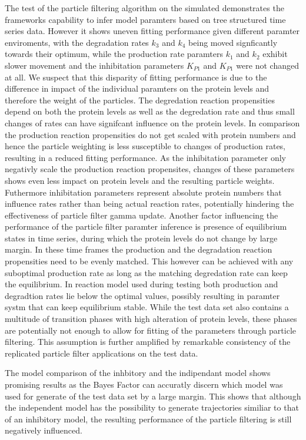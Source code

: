 \documentclass{bioinfo}
\begin{document}
The test of the particle filtering algorithm on the simulated demonstrates the frameworks capability to infer model paramters based on tree structured time series data. However it shows uneven fitting performance given different paramter enviroments, with the degradation rates $k_3$ and $k_4$ being moved signficantly towards their optimum, while the production rate paramters $k_1$ and $k_2$ exhibit slower movement and the inhibitation parameters $K_{P1}$ and $K_{P1}$ were not changed at all. We suspect that this disparity of fitting performance is due to the difference in impact of the individual paramters on the protein levels and therefore the weight of the particles. The degredation reaction propensities depend on both the protein levels as well as the degredation rate and thus small changes of rates can have signifcant influence on the protein levels. In comparison the production reaction propensities do not get scaled with protein numbers and hence the particle weighting is less susceptible to changes of production rates, resulting in a reduced fitting performance. As the inhibitation parameter only negativly scale the production reaction propensites, changes of these parameters shows even less impact on protein levels and the resulting particle weights. Futhermore inhibitation parameters represent absolute protein numbers that influence rates rather than being actual reaction rates, potentially hindering the effectiveness of particle filter gamma update. Another factor influencing the performance of the particle filter paramter inference is presence of equilibrium states in time series, during which the protein levels do not change by large margin. In these time frames the production and the degradation reaction propensities need to be evenly matched. This however can be achieved with any suboptimal production rate as long as the matching degredation rate can keep the equilibrium. In reaction model used during testing both production and degradtion rates lie below the optimal values, possibly resulting in paramter systm that can keep equilibrium stable. While the test data set also contains a multitude of transition phases with high alteration of protein levels, these phases are potentially not enough to allow for fitting of the parameters through particle filtering. This assumption is further amplified by remarkable consistency of the replicated particle filter applications on the test data.


The model comparison of the inhbitory and the indipendant model shows promising results as the Bayes Factor can accuratly discern which model was used for generate of the test data set by a large margin. This shows that although the independent model has the possibility to generate trajectories similiar to that of an inhibitory model, the resulting performance of the particle filtering is still negatively influenced.
\end{document}
